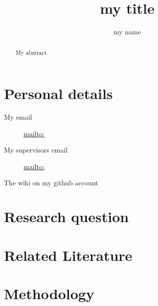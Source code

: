 \documentclass[sigconf,authordraft]{acmart}
\begin{document}
\title{my title} %
\author{my name}

\maketitle


\begin{abstract}
My abstract
\end{abstract}


\section{Personal details}

\begin{description}
 \item[My email] \url{mailto: }
 \item[My supervisors email] \url{mailto: }
 \item[The wiki on my github account] \url{}
 \end{description} 

\section{Research question}


 \section{Related Literature}
 
 
	
	
\section{Methodology}
\end{document}
